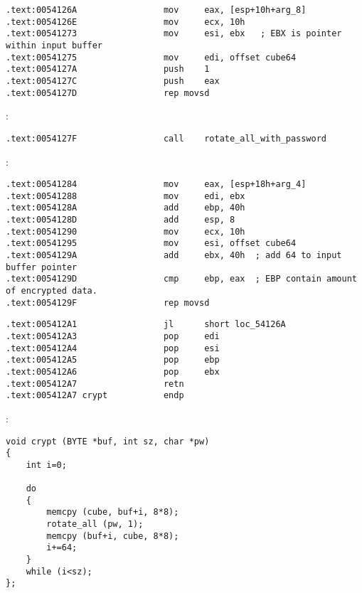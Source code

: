 \begin{lstlisting}
.text:0054126A                 mov     eax, [esp+10h+arg_8]
.text:0054126E                 mov     ecx, 10h
.text:00541273                 mov     esi, ebx   ; EBX is pointer within input buffer
.text:00541275                 mov     edi, offset cube64
.text:0054127A                 push    1
.text:0054127C                 push    eax
.text:0054127D                 rep movsd
\end{lstlisting}

 :

\begin{lstlisting}
.text:0054127F                 call    rotate_all_with_password
\end{lstlisting}

:

\begin{lstlisting}
.text:00541284                 mov     eax, [esp+18h+arg_4]
.text:00541288                 mov     edi, ebx
.text:0054128A                 add     ebp, 40h
.text:0054128D                 add     esp, 8
.text:00541290                 mov     ecx, 10h
.text:00541295                 mov     esi, offset cube64
.text:0054129A                 add     ebx, 40h  ; add 64 to input buffer pointer
.text:0054129D                 cmp     ebp, eax  ; EBP contain amount of encrypted data.
.text:0054129F                 rep movsd
\end{lstlisting}


\begin{lstlisting}
.text:005412A1                 jl      short loc_54126A
.text:005412A3                 pop     edi
.text:005412A4                 pop     esi
.text:005412A5                 pop     ebp
.text:005412A6                 pop     ebx
.text:005412A7                 retn
.text:005412A7 crypt           endp
\end{lstlisting}

:

\begin{lstlisting}
void crypt (BYTE *buf, int sz, char *pw)
{
	int i=0;
	
	do
	{
		memcpy (cube, buf+i, 8*8);
		rotate_all (pw, 1);
		memcpy (buf+i, cube, 8*8);
		i+=64;
	}
	while (i<sz);
};
\end{lstlisting}


